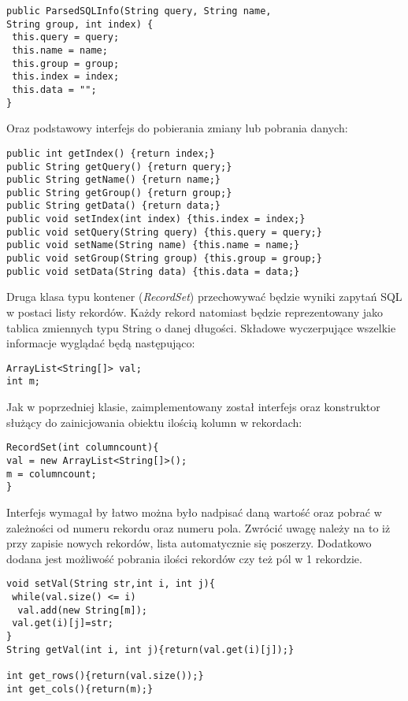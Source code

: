 \begin{lstlisting}
public ParsedSQLInfo(String query, String name,
String group, int index) {
 this.query = query;
 this.name = name;
 this.group = group;
 this.index = index;
 this.data = "";
}
\end{lstlisting}

Oraz podstawowy interfejs do pobierania zmiany lub pobrania danych:
\begin{lstlisting}
public int getIndex() {return index;}
public String getQuery() {return query;}
public String getName() {return name;}
public String getGroup() {return group;}
public String getData() {return data;}
public void setIndex(int index) {this.index = index;}
public void setQuery(String query) {this.query = query;}
public void setName(String name) {this.name = name;}
public void setGroup(String group) {this.group = group;}
public void setData(String data) {this.data = data;}
\end{lstlisting}


Druga klasa typu kontener (\emph{RecordSet}) przechowywać będzie wyniki zapytań SQL w postaci listy rekordów. Każdy rekord natomiast będzie reprezentowany jako tablica zmiennych typu String o danej długości. Składowe wyczerpujące wszelkie informacje wyglądać będą następująco:

\begin{lstlisting}
ArrayList<String[]> val;
int m;
\end{lstlisting}

Jak w poprzedniej klasie, zaimplementowany został interfejs oraz konstruktor służący do zainicjowania obiektu ilością kolumn w rekordach:
 \begin{lstlisting}
RecordSet(int columncount){
val = new ArrayList<String[]>();
m = columncount;
}
 \end{lstlisting}

Interfejs wymagał by łatwo można było nadpisać daną wartość oraz pobrać w zależności od numeru rekordu oraz numeru pola. Zwrócić uwagę należy na to iż przy zapisie nowych rekordów, lista automatycznie się poszerzy. Dodatkowo dodana jest możliwość pobrania ilości rekordów czy też pól w 1 rekordzie.
 \begin{lstlisting}
void setVal(String str,int i, int j){
 while(val.size() <= i)
  val.add(new String[m]);
 val.get(i)[j]=str;
}
String getVal(int i, int j){return(val.get(i)[j]);}   

int get_rows(){return(val.size());}
int get_cols(){return(m);}
\end{lstlisting}

